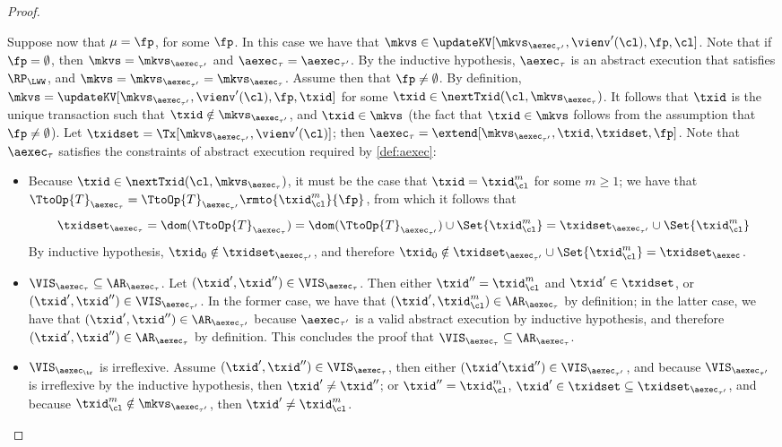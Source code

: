 \begin{proof}
\begin{itemize}
Suppose now that $\mu = \fp$, for some $\fp$. In this case we have that  
$\mkvs \in \updateKV[\mkvs_{\aexec_{\tau'}}, \vienv'(\cl), \fp, \cl]$. Note that if 
$\fp = \emptyset$, then $\mkvs = \mkvs_{\aexec_{\tau'}}$ and $\aexec_{\tau} = \aexec_{\tau'}$. 
By the inductive hypothesis, $\aexec_{\tau}$ is an abstract execution that satisfies 
$\RP_{\LWW}$, and $\mkvs = \mkvs_{\aexec_{\tau'}} = \mkvs_{\aexec_{\tau}}$. 
Assume then that $\fp \neq \emptyset$. 
By definition, $\mkvs = \updateKV[\mkvs_{\aexec_{\tau'}}, \vienv'(\cl), \fp, \txid]$ 
for some $\txid \in \nextTxid(\cl, \mkvs_{\aexec_{\tau}})$. It follows that $\txid$ 
is the unique transaction such that $\txid \notin \mkvs_{\aexec_{\tau'}}$, and $\txid \in \mkvs$ 
(the fact that $\txid \in \mkvs$ follows from the assumption that $\fp \neq \emptyset$). Let 
$\txidset = \Tx[\mkvs_{\aexec_{\tau'}}, \vienv'(\cl)]$; then $\aexec_{\tau} = \extend[\mkvs_{\aexec_{\tau'}}, \txid, \txidset, \fp]$. 
Note that $\aexec_{\tau}$ satisfies the constraints of abstract execution required by \cref{def:aexec}:
\begin{itemize}
\item  Because $\txid \in \nextTxid(\cl, \mkvs_{\aexec_{\tau}})$, it must be the case that $\txid = \txid_{\cl}^{m}$ for some 
$m \geq 1$; we have that $\TtoOp{T}_{\aexec_{\tau}} = \TtoOp{T}_{\aexec_{\tau'}}\rmto{\txid_{\cl}^{m}}{\fp}$, 
from which it follows that 
\[
\txidset_{\aexec_{\tau}} = \dom(\TtoOp{T}_{\aexec_{\tau}}) = \dom(\TtoOp{T}_{\aexec_{\tau'}}) \cup 
\Set{\txid_{\cl}^{m} } = \txidset_{\aexec_{\tau'}} \cup \Set{\txid_{\cl}^{m} }
\]
By inductive hypothesis, $\txid_0 \notin \txidset_{\aexec_{\tau'}}$, and therefore $\txid_{0} \notin 
\txidset_{\aexec_{\tau'}} \cup \Set{\txid_{\cl}^{m} } = \txidset_{\aexec}$.

\item \( \VIS_{\aexec_{\tau}} \subseteq \AR_{\aexec_{\tau}} \).
    Let $(\txid' ,\txid'') \in \VIS_{\aexec_{\tau}}$. Then either $\txid'' = \txid_{\cl}^{m}$ and $\txid' \in \txidset$, or $(\txid', \txid'') \in 
\VIS_{\aexec_{\tau'}}$. In the former case, we have that $(\txid', \txid_{\cl}^{m}) \in \AR_{\aexec_{\tau}}$ by definition; 
in the latter case, we have that $(\txid', \txid'') \in \AR_{\aexec_{\tau'}}$ because $\aexec_{\tau'}$ is a valid 
abstract execution by inductive hypothesis, and therefore $(\txid', \txid'') \in \AR_{\aexec_{\tau}}$ by definition. 
This concludes the proof that $\VIS_{\aexec_{\tau}} \subseteq \AR_{\aexec_{\tau}}$. 
\item \( \VIS_{\aexec_\tr} \) is irreflexive.
Assume $(\txid', \txid'') \in \VIS_{\aexec_{\tau}}$, then either 
$(\txid' \txid'') \in \VIS_{\aexec_{\tau'}}$, and because $\VIS_{\aexec_{\tau'}}$ is irreflexive by the inductive hypothesis, 
then $\txid' \neq \txid''$; 
or $\txid'' = \txid_{\cl}^{m}$, $\txid' \in \txidset \subseteq \txidset_{\aexec_{\tau'}}$, 
and because $\txid_{\cl}^{m} \notin \mkvs_{\aexec_{\tau'}}$, then $\txid' \neq \txid_{\cl}^{m}$. 


\end{itemize}
\end{itemize}
\end{proof}

